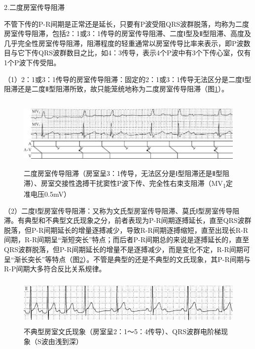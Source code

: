 2.二度房室传导阻滞

不管下传的P-R间期是正常还是延长，只要有P波受阻QRS波群脱落，均称为二度房室传导阻滞，包括2：1或3：1传导的房室传导阻滞、二度Ⅰ型及Ⅱ型阻滞、高度及几乎完全性房室传导阻滞，阻滞程度的轻重通常以房室传导比率来表示，即P波数目与它下传QRS波群数目之比，如4：3传导，表示4个P波中有3个下传心室，仅有1个P波下传受阻。

（1）2：1或3：1传导的房室传导阻滞：固定的2：1或3：1传导无法区分是二度Ⅰ型阻滞还是二度Ⅱ型阻滞所致，故只能笼统地称为二度房室传导阻滞（图\ref{fig20-5}）。

\begin{figure}[!htbp]
 \centering
 \includegraphics[width=5.79167in,height=1.38542in]{./images/Image00334.jpg}
 \captionsetup{justification=centering}
 \caption{二度房室传导阻滞（房室呈3：1传导，无法区分是Ⅰ型阻滞还是Ⅱ型阻滞）、房室交接性逸搏干扰窦性P波下传、完全性右束支阻滞（MV\textsubscript{1}定准电压0.5mV）}
 \label{fig20-5}
  \end{figure} 


（2）二度Ⅰ型房室传导阻滞：又称为文氏型房室传导阻滞、莫氏Ⅰ型房室传导阻滞。有典型和不典型文氏现象之分，前者表现为P-R间期逐搏延长，直至QRS波群脱落，但P-R间期延长的增量逐搏减少，导致R-R间期逐搏缩短，直至出现长R-R间期，R-R间期呈“渐短突长”特点；而后者P-R间期总的来说是逐搏延长的，直至QRS波群脱落，但P-R间期延长的增量不是逐搏减少，而是变化不定，R-R间期可呈“渐长突长”等特点（图\ref{fig20-6}）。不管是典型的还是不典型的文氏现象，其P-R间期与R-P间期大多符合反比关系规律。

\begin{figure}[!htbp]
 \centering
 \includegraphics[width=5.58333in,height=0.92708in]{./images/Image00335.jpg}
 \captionsetup{justification=centering}
 \caption{不典型房室文氏现象（房室呈2：1～5：4传导）、QRS波群电阶梯现象（S波由浅到深）}
 \label{fig20-6}
  \end{figure} 

